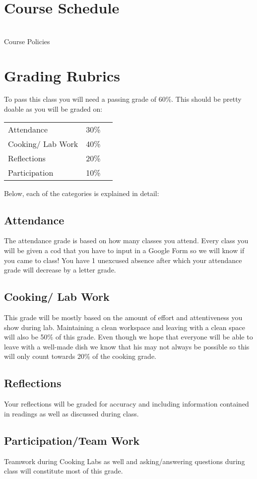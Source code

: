 \documentclass{article}
\begin{document}
 \section*{Course Schedule }\\
Course Policies

\section{Grading Rubrics} 


To pass this class you will need a passing grade of 60\%. This should be pretty doable as you will be graded on:

\begin{table}[h]
\begin{tabular}{lll}
 Attendance &  30\% \\
 Cooking/ Lab Work & 40\%  \\
 Reflections &  20\%  \\
 Participation & 10\% \\ 
\end{tabular}
\end{table}   

Below, each of the categories is explained in detail:
\subsection{Attendance}
 The attendance grade is based on how many classes you attend. Every class you will be given a cod that you have to input in a Google Form so we will know if you came to class! You have 1 unexcused absence after which  your attendance grade will decrease by a letter grade.

\subsection{Cooking/ Lab Work} This grade will be mostly based on the amount of effort and attentiveness you show during lab. Maintaining a clean workspace and leaving with a clean space will also be 50\% of this grade. Even though we hope that everyone will be able to leave with a well-made dish we know that his may not always be possible so this will only count towards 20\% of the cooking grade.

\subsection{Reflections} Your reflections will be graded for accuracy and including information contained in readings as well as discussed during class.

\subsection{Participation/Team Work} Teamwork during Cooking Labs as well and asking/answering questions during class will constitute most of this grade.
\end{document}
